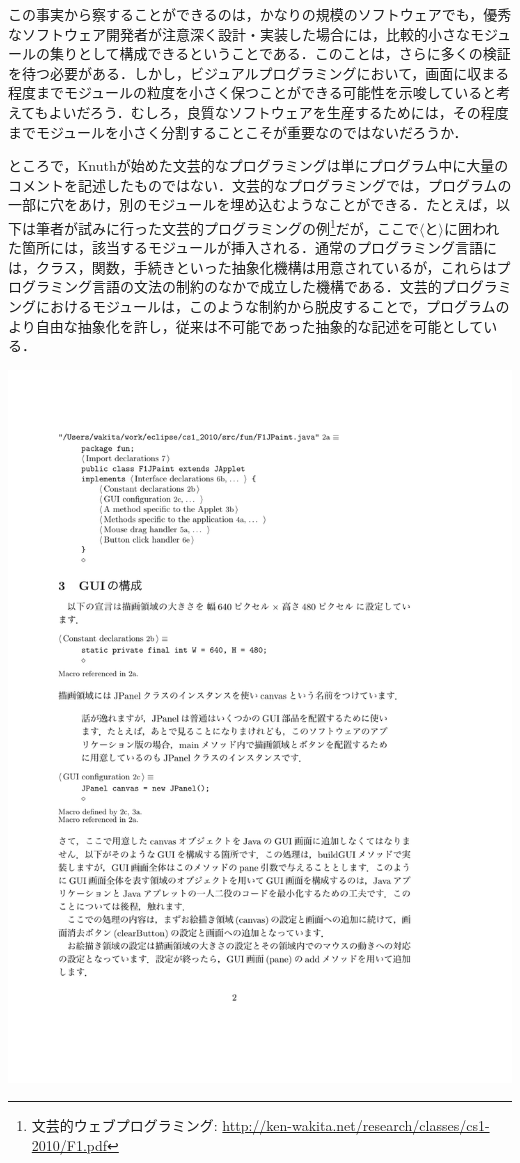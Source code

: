 \documentclass [11pt] {jsarticle}
\begin{document}
この事実から察することができるのは，かなりの規模のソフトウェアでも，優秀なソフトウェア開発者が注意深く設計・実装した場合には，比較的小さなモジュールの集りとして構成できるということである．このことは，さらに多くの検証を待つ必要がある．しかし，ビジュアルプログラミングにおいて，画面に収まる程度までモジュールの粒度を小さく保つことができる可能性を示唆していると考えてもよいだろう．むしろ，良質なソフトウェアを生産するためには，その程度までモジュールを小さく分割することこそが重要なのではないだろうか．

ところで，Knuthが始めた文芸的なプログラミングは単にプログラム中に大量のコメントを記述したものではない．文芸的なプログラミングでは，プログラムの一部に穴をあけ，別のモジュールを埋め込むようなことができる．たとえば，以下は筆者が試みに行った文芸的プログラミングの例\footnote {文芸的ウェブプログラミング: \url {http://ken-wakita.net/research/classes/cs1-2010/F1.pdf}}だが，ここで$\langle\text {と}\rangle$に囲われた箇所には，該当するモジュールが挿入される．通常のプログラミング言語には，クラス，関数，手続きといった抽象化機構は用意されているが，これらはプログラミング言語の文法の制約のなかで成立した機構である．文芸的プログラミングにおけるモジュールは，このような制約から脱皮することで，プログラムのより自由な抽象化を許し，従来は不可能であった抽象的な記述を可能としている．

\centerline {\includegraphics [scale=.85] {figs/F1JPaint.pdf}}
\end{document}
